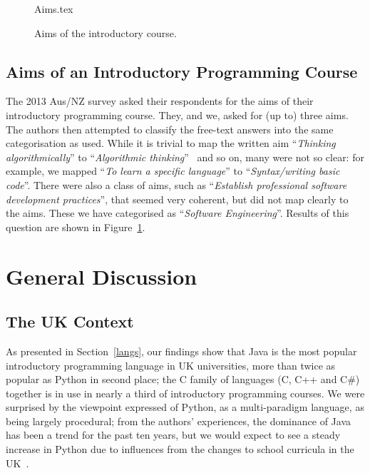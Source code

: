 \documentclass{sig-alternate}
\begin{document}
\fi

\begin{figure}
\begin{center}
{Aims.tex}
\end{center}\vskip-18pt
\caption{Aims of the introductory course. \label{fig:aims}}
\end{figure}

\subsection{Aims of an Introductory Programming Course}

The 2013 Aus/NZ survey asked their respondents for the aims of their
introductory programming course. They, and we, asked for (up to) three
aims. The authors then attempted to classify the free-text answers
into the same categorisation as \cite{mason+cooper:2014} used. While
it is trivial to map the written aim ``{\emph{Thinking
algorithmically}}'' to ``{\emph{Algorithmic
thinking}}''~\cite{mason+cooper:2014} and so on, many were not so
clear: for example, we mapped ``{\emph{To learn a specific
language}}'' to ``{\emph{Syntax/writing basic code}}''. There were
also a class of aims, such as ``{\emph{Establish professional software
development practices}}'', that seemed very coherent, but did not map
clearly to the \cite{mason+cooper:2014} aims. These we have
categorised as ``{\emph{Software Engineering}}''. Results of this
question are shown in Figure~\ref{fig:aims}.

\section{General Discussion}\label{discussion}

\subsection{The UK Context}

As presented in Section~\ref{langs}, our findings show that Java is
the most popular introductory programming language in UK universities,
more than twice as popular as Python in second place; the C family of
languages (C, C++ and C\#) together is in use in nearly a third of
introductory programming courses. We were surprised by the viewpoint
expressed of Python, as a multi-paradigm language, as being largely
procedural; from the authors' experiences, the dominance of Java has
been a trend for the past ten years, but we would expect to see a
steady increase in Python due to influences from the changes to school
curricula in the UK~\cite{brown-et-al-toce2014}.
\end{document}
